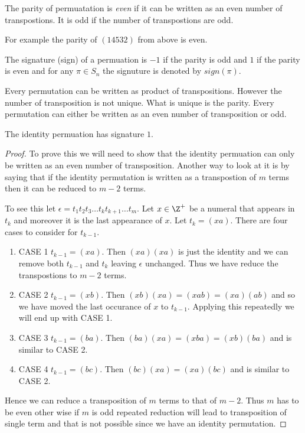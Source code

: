 \begin{Definition}
    The parity of permuatation is \emph{even} if it can be written as an even number of
    transpostions. It is odd if the number of transpostions are odd. 
\end{Definition}
For example the parity of $(14532)$ from above is even. 
\begin{Definition}
    The signature (sign) of a permuation is $-1$ if the parity is odd and $1$ if the parity is
    even and for any $\pi \in S_n$ the signuture is denoted by $sign(\pi)$. 
\end{Definition}

Every permutation can be written as product of transpositions. However the number of transposition
is not unique. What is unique is the parity. Every permutation can either be written as an even
number of transposition or odd.

\begin{Theorem}
    The identity permuation has signature $1$.
\end{Theorem}
\begin{proof}
    To prove this we will need to show that the identity permuation can only be written as an even
    number of transposition. Another way to look at it is by saying that if the identity permutation
    is written as a transpostion of $m$ terms then it can be reduced to $m-2$ terms. 

    To see this let $\epsilon = t_{1}t_{2}t_{3}{\dots}{t_{k}}t_{k+1}\dots t_m$. Let $x \in \Z^{+}$ be a numeral
    that appears in $t_k$ and moreover it is the last appearance of $x$. Let $t_k = (xa)$. There are
    four cases to consider for $t_{k-1}$.
    \begin{enumerate}
	\item CASE 1 $t_{k-1} = (xa)$. Then $(xa)(xa)$ is just the identity and we can remove both $t_{k-1}$ 
	    and $t_k$ leaving $\epsilon$ unchanged. Thus we have reduce the transpostions to $m-2$ terms.
	\item CASE 2 $t_{k-1} = (xb)$. Then $(xb)(xa) = (xab) = (xa)(ab)$ and so we have moved the 
	    last occurance of $x$ to $t_{k-1}$. Applying this repeatedly we will end up with CASE 1.
	\item CASE 3 $t_{k-1} = (ba)$. Then $(ba)(xa) = (xba) = (xb)(ba)$ and is similar to CASE 2.
	\item CASE 4 $t_{k-1} = (bc)$. Then $(bc)(xa) = (xa)(bc)$ and is similar to CASE 2.
    \end{enumerate}

    Hence we can reduce a transposition of $m$ terms to that of $m-2$. Thus $m$ has to be even other
    wise if $m$ is odd repeated reduction will lead to transposition of single term and that is not
    possible since we have an identity permutation.
\end{proof}

